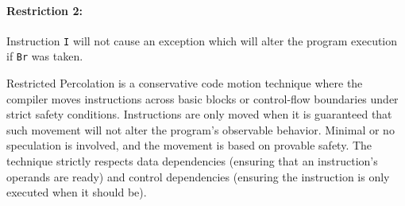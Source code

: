 \paragraph{Restriction 2:} Instruction \texttt{I} will not cause an exception which will alter the program execution if \texttt{Br} was taken. 


Restricted Percolation is a conservative code motion technique where the compiler moves instructions across basic blocks or control-flow boundaries under strict safety conditions. Instructions are only moved when it is guaranteed that such movement will not alter the program's observable behavior. Minimal or no speculation is involved, and the movement is based on provable safety. The technique strictly respects data dependencies (ensuring that an instruction's operands are ready) and control dependencies (ensuring the instruction is only executed when it should be).
